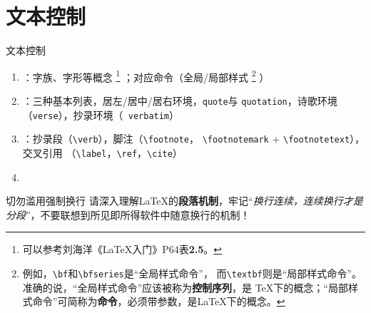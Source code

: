 \documentclass[10pt]{beamer}
\begin{document}
\section{文本控制}
\begin{frame}{文本控制}
\begin{enumerate}
    \item {}：字族、字形等概念
    \footnote{可以参考刘海洋《\LaTeX{}入门》P64表\textbf{2.5}。}
    ；对应命令（全局/局部样式
    \footnote{例如，\texttt{\textbackslash{}bf}和\texttt{\textbackslash{}bfseries}是“全局样式命令”，
    而\texttt{\textbackslash{}textbf}则是“局部样式命令”。准确的说，“全局样式命令”应该被称为\textbf{控制序列}，是
    \TeX 下的概念；“局部样式命令”可简称为\textbf{命令}，必须带参数，是\LaTeX 下的概念。}
    ）
    \item {}：三种基本列表，居左/居中/居右环境，\texttt{quote}与
    \texttt{quotation}，诗歌环境（\texttt{verse}），抄录环境（\texttt{
    verbatim}）
    \item {}：抄录段（\texttt{\textbackslash{}verb}），脚注（\texttt{\textbackslash{}footnote}，
    \texttt{\textbackslash{}footnotemark} + \texttt{\textbackslash{}footnotetext}），交叉引用
    （\texttt{\textbackslash{}label}，\texttt{\textbackslash{}ref}，\texttt{\textbackslash{}cite}）
    \item {}
\end{enumerate}
\begin{alertblock}{切勿滥用强制换行}
请深入理解\LaTeX 的\textbf{段落机制}，牢记“\textit{换行连续，连续换行才是分段}”，不要联想到所见即所得软件中随意换行的机制！
\end{alertblock}
\end{frame}
\end{document}

